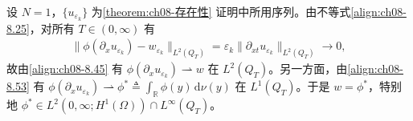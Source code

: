 \documentclass[../../main.tex]{subfiles}%
\begin{document}
\begin{remark}\label{remark:ch08-w等于phi星}
设 $N=1$，$\{u_{\varepsilon_k}\}$ 为\cref{theorem:ch08-存在性} 证明中所用序列。由不等式\eqref{align:ch08-8.25}，对所有 $T\in(0,\infty)$ 有
\begin{align*}
\|\phi(\partial_x u_{\varepsilon_k})-w_{\varepsilon_k}\|_{L^2(Q_T)}=\varepsilon_k\|\partial_{xt}u_{\varepsilon_k}\|_{L^2(Q_T)}\to0,
\end{align*}
故由\eqref{align:ch08-8.45} 有 $\phi(\partial_x u_{\varepsilon_k})\rightharpoonup w$ 在 $L^2(Q_T)$。另一方面，由\eqref{align:ch08-8.53} 有 $\phi(\partial_x u_{\varepsilon_k})\rightharpoonup\phi^*\triangleq\int_{\mathbb{R}}\phi(y)\,\mathrm{d}\nu(y)$ 在 $L^1(Q_T)$。于是 $w=\phi^*$，特别地 $\phi^*\in L^2(0,\infty;H^1(\Omega))\cap L^\infty(Q_T)$。
\end{remark}
\end{document}
